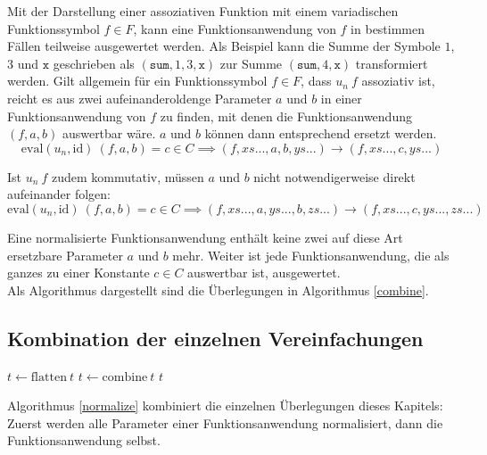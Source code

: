 \documentclass{scrartcl}
\numberwithin{figure}{section} %
\theoremstyle{definition} %
\begin{document}
Mit der Darstellung einer assoziativen Funktion mit einem variadischen Funktionssymbol $f \in F$, kann eine Funktionsanwendung von $f$ in bestimmen Fällen teilweise ausgewertet werden. Als Beispiel kann die Summe der Symbole $1$, $3$ und $\texttt{x}$ geschrieben als $(\texttt{sum}, 1, 3, \texttt{x})$ zur Summe $(\texttt{sum}, 4, \texttt{x})$ transformiert werden. 
Gilt allgemein für ein Funktionssymbol $f \in F$, dass $u_n~f$ assoziativ ist, reicht es aus zwei aufeinanderoldenge Parameter $a$ und $b$ in einer Funktionsanwendung von $f$ zu finden, mit denen die Funktionsanwendung $(f, a, b)$ auswertbar wäre. $a$ und $b$ können dann entsprechend ersetzt werden.
$$\mathrm{eval}(u_n, \mathrm{id})~(f, a, b) = c \in C \implies (f, xs..., a, b, ys...) \rightarrow (f, xs..., c, ys...)$$

Ist $u_n~f$ zudem kommutativ, müssen $a$ und $b$ nicht notwendigerweise direkt aufeinander folgen:
$$\mathrm{eval}(u_n, \mathrm{id})~(f, a, b) = c \in C \implies (f, xs..., a, ys..., b, zs...) \rightarrow (f, xs..., c, ys..., zs...)$$

Eine normalisierte Funktionsanwendung enthält keine zwei auf diese Art ersetzbare Parameter $a$ und $b$ mehr. Weiter ist jede Funktionsanwendung, die als ganzes zu einer Konstante $c \in C$ auswertbar ist, ausgewertet.\\
Als Algorithmus dargestellt sind die Überlegungen in Algorithmus \ref{combine}.

\subsection{Kombination der einzelnen Vereinfachungen}

\begin{algorithm}
\DontPrintSemicolon
\caption{$\mathrm{normalize} \colon T \rightarrow T$}\label{normalize}

$t \leftarrow \mathrm{flatten}~t$\;
$t \leftarrow \mathrm{combine}~t$\;
\Return $t$ 
\end{algorithm}
Algorithmus \ref{normalize} kombiniert die einzelnen Überlegungen dieses Kapitels: Zuerst werden alle Parameter einer Funktionsanwendung normalisiert, dann die Funktionsanwendung selbst. 



\end{document}
